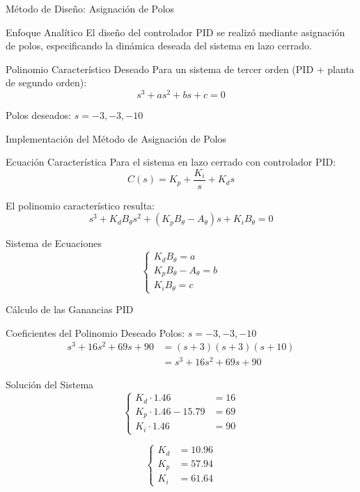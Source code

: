 \documentclass{beamer}
\begin{document}
\begin{frame}{Método de Diseño: Asignación de Polos}
\begin{block}{Enfoque Analítico}
El diseño del controlador PID se realizó mediante asignación de polos, especificando la dinámica deseada del sistema en lazo cerrado.
\end{block}

\begin{block}{Polinomio Característico Deseado}
Para un sistema de tercer orden (PID + planta de segundo orden):
\[
s^3 + a s^2 + b s + c = 0
\]

Polos deseados: $s = -3, -3, -10$
\end{block}
\end{frame}

\begin{frame}{Implementación del Método de Asignación de Polos}
\begin{block}{Ecuación Característica}
Para el sistema en lazo cerrado con controlador PID:
\[
C(s) = K_p + \frac{K_i}{s} + K_d s
\]

El polinomio característico resulta:
\[
s^3 + K_d B_\theta s^2 + (K_p B_\theta - A_\theta) s + K_i B_\theta = 0
\]
\end{block}

\begin{block}{Sistema de Ecuaciones}
\[
\begin{cases}
K_d B_\theta = a \\
K_p B_\theta - A_\theta = b \\
K_i B_\theta = c
\end{cases}
\]
\end{block}
\end{frame}

\begin{frame}{Cálculo de las Ganancias PID}
\begin{block}{Coeficientes del Polinomio Deseado}
Polos: $s = -3, -3, -10$
\[
\begin{aligned}
s^3 + 16s^2 + 69s + 90 &= (s+3)(s+3)(s+10) \\
&= s^3 + 16s^2 + 69s + 90
\end{aligned}
\]
\end{block}

\begin{block}{Solución del Sistema}
\[
\begin{cases}
K_d \cdot 1.46 &= 16 \\
K_p \cdot 1.46 - 15.79 &= 69 \\
K_i \cdot 1.46 &= 90
\end{cases}
\]

\[
\begin{cases}
K_d &= 10.96 \\
K_p &= 57.94 \\
K_i &= 61.64
\end{cases}
\]
\end{block}
\end{frame}
\end{document}
